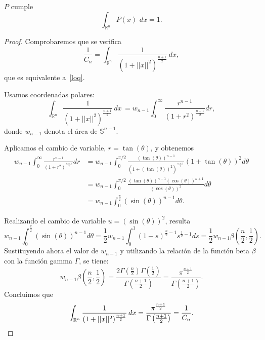 \begin{lema}\label{lem:leam}
$P$ cumple
\begin{equation}\label{loq}
    \int_{\mathbb{R}^n} P(x)\, \, dx = 1 .
\end{equation}
\end{lema}
\begin{proof}

Comprobaremos que se verifica
\begin{equation}
        \frac{1}{C_n} = \int_{\mathbb{R}^n} \frac{1}{(1 + ||x||^2)^{\frac{n+1}{2}}} \,dx,
\end{equation}
que es equivalente a~\eqref{loq}.

\noindent Usamos coordenadas polares:
\[
\int_{\mathbb{R}^n} \frac{1}{(1 + ||x||^2)^{\frac{n+1}{2}}} \, dx \,  = w_{n-1}\int_{0}^{\infty} \frac{r^{n-1}}{(1+r^2)^{\frac{n+1}{2}}} dr,
\]
donde $w_{n-1}$ denota el área de $\mathbb{S}^{n-1}$.

\noindent Aplicamos el cambio de variable, \(r = \tan(\theta)\), y obtenemos
\begin{align}
 w_{n-1}\int_{0}^{\infty} \frac{r^{n-1}}{(1+r^2)^{\frac{n+1}{2}}} dr &=  w_{n-1}\int_{0}^{\pi/2} \frac{(\tan(\theta))^{n-1}}{(1+(\tan(\theta))^2)^{\frac{n+1}{2}}} (1+ \tan(\theta))^2 d\theta \\
 &=  w_{n-1}\int_{0}^{\pi/2} \frac{(\tan(\theta))^{n-1}(\cos(\theta))^{n+1}}{(\cos(\theta))^2} d\theta \\
 &=  w_{n-1}\int_{0}^{\frac{\pi}{2}} (\sin(\theta))^{n-1} d\theta.
\end{align}

\noindent Realizando el cambio de variable $u = (\sin(\theta))^2$, resulta
\[
w_{n-1}\int_{0}^{\frac{\pi}{2}} (\sin(\theta))^{n-1} d\theta =  \frac{1}{2}w_{n-1}\int_{0}^{1} (1-s)^{\frac{n}{2}-1}s^{\frac{1}{2}-1} ds = \frac{1}{2}w_{n-1}\beta\left(\frac{n}{2},\frac{1}{2}\right).
\]
Sustituyendo ahora el valor de $w_{n-1}$ y utilizando la relación de la función beta $\beta$ con la función gamma $\Gamma$, se tiene:
\[
 w_{n-1}\beta\left(\frac{n}{2},\frac{1}{2}\right)= \frac{2 \Gamma\left(\frac{n}{2}\right) \Gamma\left(\frac{1}{2}\right)}{\Gamma\left(\frac{n+1}{2}\right)} = \frac{\pi^{\frac{n+1}{2}}}{\Gamma\left(\frac{n+1}{2}\right)}.
\]
Concluimos que
\begin{equation*}
\int_{\mathbb{R}^n} \frac{1}{(1 + ||x||^2)^{\frac{n+1}{2}}} \, dx =
\frac{\pi^{\frac{n+1}{2}}}{\Gamma\left(\frac{n+1}{2}\right)} = \frac{1}{C_n}.  \qedhere
\end{equation*}
 
\end{proof}


